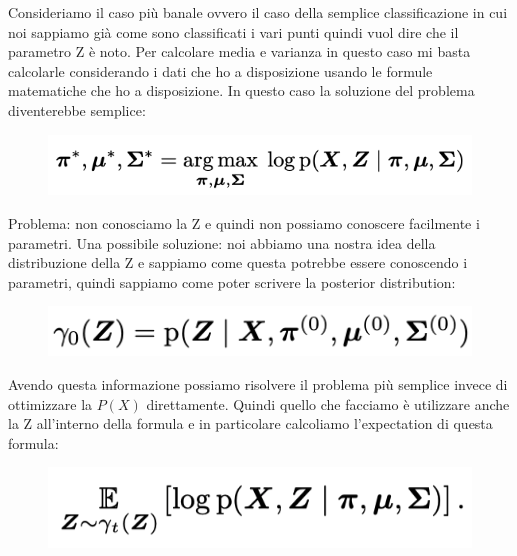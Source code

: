 \documentclass[14pt]{extreport}
\begin{document}
Consideriamo il caso più banale ovvero il caso della semplice classificazione in cui noi sappiamo già come sono classificati i vari punti quindi vuol
dire che il parametro Z è noto. Per calcolare media e varianza in questo caso mi basta calcolarle considerando i dati che ho a disposizione usando le
formule matematiche che ho a disposizione. In questo caso la soluzione del problema diventerebbe semplice:

\begin{figure}[H]
	\centering
	\includegraphics[width=0.7\linewidth]{549.jpeg}
\end{figure}

Problema: non conosciamo la Z e quindi non possiamo conoscere facilmente i parametri. Una possibile soluzione: noi abbiamo una nostra idea della
distribuzione della Z e sappiamo come questa potrebbe essere conoscendo i parametri, quindi sappiamo come poter scrivere la posterior distribution:

\begin{figure}[H]
	\centering
	\includegraphics[width=0.7\linewidth]{550.jpeg}
\end{figure}

Avendo questa informazione possiamo risolvere il problema più semplice invece di ottimizzare la $P(X)$ direttamente. Quindi quello che facciamo è
utilizzare anche la Z all'interno della formula e in particolare calcoliamo l'expectation di questa formula:


\begin{figure}[H]
	\centering
	\includegraphics[width=0.7\linewidth]{551.jpeg}
\end{figure}
\end{document}
